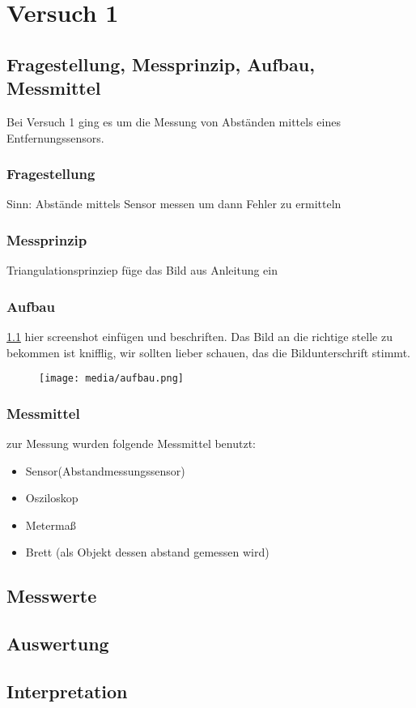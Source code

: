 \chapter{Versuch 1}
\label{chap:VERSUCH_1}

\section{Fragestellung, Messprinzip, Aufbau, Messmittel}
\label{chap:VERSUCH_1_FRAGESTELLUNG}

Bei Versuch 1 ging es um die Messung von Abständen mittels eines Entfernungssensors. 

\subsection*{Fragestellung}

	Sinn: Abstände mittels Sensor messen um dann Fehler zu ermitteln
\subsection*{Messprinzip}
	Triangulationsprinziep
	füge das Bild aus Anleitung ein
\subsection*{Aufbau}
	\ref{Versuchsaufbau}
	hier screenshot einfügen und beschriften. Das Bild an die richtige stelle zu bekommen ist knifflig, wir sollten lieber schauen, das die Bildunterschrift stimmt.
	\begin{figure}[h] %
		\texttt{[image: media/aufbau.png]}
		\label{Versuchsaufbau}
	\end{figure}
	
\subsection*{Messmittel}
	zur Messung wurden folgende Messmittel benutzt:
	\begin{itemize}
		\item Sensor(Abstandmessungssensor)
		\item Osziloskop		
		\item Metermaß
		\item Brett (als Objekt dessen abstand gemessen wird)
	\end{itemize}


\section{Messwerte}
\label{chap:VERSUCH_1_MESSWERTE}

	
	
	

\section{Auswertung}
\label{chap:VERSUCH_1_AUSWERTUNG}
	
	
\section{Interpretation}
\label{chap:VERSUCH_1_INTERPRETATION}
